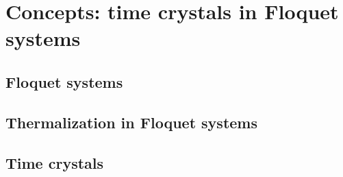 \chapter{Concepts: time crystals in Floquet systems}\label{ch:introduction-floquet}

\section{Floquet systems}

\section{Thermalization in Floquet systems}

\section{Time crystals}
